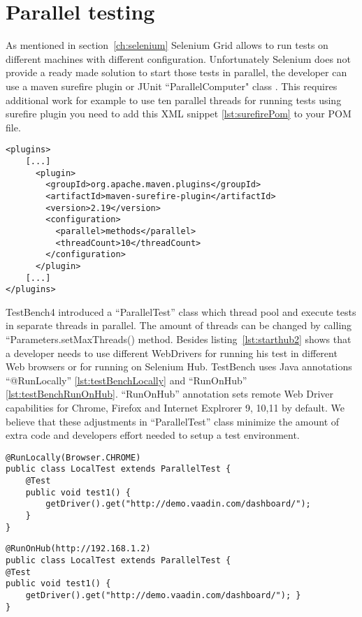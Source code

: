 \section{Parallel testing}
\label{paralelTesting}
As mentioned in section~\ref{ch:selenium} Selenium Grid allows to run
tests on different machines with different configuration. Unfortunately
Selenium does not provide a ready made solution to start those tests in
parallel, the developer can  use a maven surefire plugin \cite{sureFire} 
or JUnit ``ParallelComputer" class \cite{junitParallelComputer}. This requires
additional work for example to use ten parallel threads for running tests using
surefire plugin you need to add this XML snippet \ref{lst:surefirePom}
to your POM file.

\lstset{style=console}
\begin{lstlisting}[caption=Get Vaadin Table cell Value,label={lst:surefirePom}]
<plugins>
    [...]
      <plugin>
        <groupId>org.apache.maven.plugins</groupId>
        <artifactId>maven-surefire-plugin</artifactId>
        <version>2.19</version>
        <configuration>
          <parallel>methods</parallel>
          <threadCount>10</threadCount>
        </configuration>
      </plugin>
    [...]
</plugins>
\end{lstlisting}	

TestBench4 introduced a ``ParallelTest'' class which thread pool and execute tests
in separate threads in parallel. The amount of threads can be changed by
calling ``Parameters.setMaxThreads() method. Besides listing~\ref{lst:starthub2}
shows that a developer needs to use different WebDrivers for running his test in
different Web browsers or for running on Selenium Hub. TestBench uses Java
annotations ``@RunLocally'' \ref{lst:testBenchLocally} and ``RunOnHub''
\ref{lst:testBenchRunOnHub}.
``RunOnHub'' annotation sets remote Web Driver capabilities for Chrome, Firefox and Internet Explrorer 9,
10,11 by default. We believe that these adjustments in ``ParallelTest'' class
minimize the amount of extra code and developers effort needed to setup a test
environment.
\lstset{style=a1listing}
\begin{lstlisting}[caption=Run test in local Chrome browser locally,label={lst:testBenchLocally}] 
@RunLocally(Browser.CHROME)
public class LocalTest extends ParallelTest { 
	@Test
	public void test1() {
		getDriver().get("http://demo.vaadin.com/dashboard/");
	}
}
\end{lstlisting}

\lstset{style=a1listing}
\begin{lstlisting}[caption=Run tests on Selenium hub on http://192.168.1.2, label={lst:testBenchRunOnHub}]
@RunOnHub(http://192.168.1.2)
public class LocalTest extends ParallelTest {
@Test
public void test1() {
	getDriver().get("http://demo.vaadin.com/dashboard/"); }
}
\end{lstlisting}

